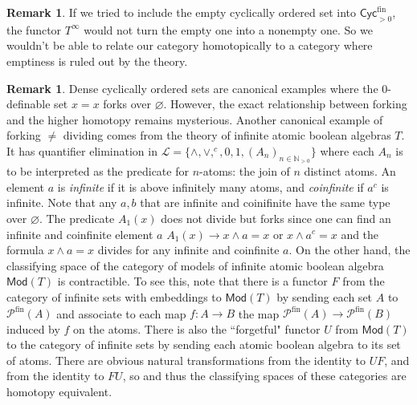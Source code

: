 \documentclass{amsart}
\newcommand{\defterm}[1]{\emph{#1}}
\theoremstyle{plain}
\theoremstyle{definition}
\newtheorem{rmk}[thm]{Remark}
\newcommand{\nats}{\mathbb{N}}
\newcommand{\Mod}{\mathsf{Mod}}
\newcommand{\Cyc}{\mathsf{Cyc}}
\newcommand{\fin}{\mathrm{fin}}
\begin{document}
\begin{rmk}
If we tried to include the empty cyclically ordered set into $\Cyc^\fin_{>0}$, the functor $T^\infty$ would not turn the empty one into a nonempty one. So we wouldn't be able to relate our category homotopically to a category where emptiness is ruled out by the theory.
\end{rmk}
\begin{rmk}\label{rmk:boolean}
Dense cyclically ordered sets are canonical examples where the $0$-definable set $x=x$ forks over $\varnothing$. However, the exact relationship between forking and the higher homotopy remains mysterious. Another canonical example of forking $\neq$ dividing comes from the theory of infinite atomic boolean algebras $T$. It has quantifier elimination in $\mathcal{L}=\{\wedge,\vee,^c,0,1,(A_n)_{n\in \nats_{>0}}\}$ where each $A_n$ is to be interpreted as the predicate for $n$-atoms: the join of $n$ distinct atoms. An element  $a$ is \defterm{infinite} if it is above infinitely many atoms, and \defterm{coinfinite} if $a^c$ is infinite. Note that any $a,b$ that are infinite and coinifinite have the same type over $\varnothing$. The predicate $A_1(x)$ does not divide but forks since one can find an infinite and coinfinite element $a$ $A_1(x)\rightarrow x\wedge a=x$ or $x\wedge a^c=x$ and the formula $x\wedge a=x$ divides for any infinite and coinfinite $a$. On the other hand, the classifying space of the category of models of infinite atomic boolean algebra $\Mod(T)$ is contractible. To see this, note that there is a functor $F$ from the category of infinite sets with embeddings to $\Mod(T)$ by sending each set $A$ to $\mathcal{P}^\fin(A)$ and associate to each map $f:A \to B$ the map $\mathcal{P}^\fin(A)\to \mathcal{P}^\fin(B)$ induced by $f$ on the atoms. There is also the ``forgetful" functor $U$ from $\Mod(T)$ to the category of infinite sets by sending each atomic boolean algebra to its set of atoms. There are obvious natural transformations from the identity to $UF$, and from the identity to $FU$, so and thus the classifying spaces of these categories are homotopy equivalent.

\end{rmk}











\end{document}
